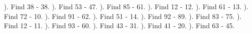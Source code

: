 \documentclass{article}%
\begin{document}
\newline%
). Find 38 {-} 38.%
\newline%
\newline%
). Find 53 {-} 47.%
\newline%
\newline%
). Find 85 {-} 61.%
\newline%
\newline%
). Find 12 {-} 12.%
\newline%
\newline%
). Find 61 {-} 13.%
\newline%
\newline%
). Find 72 {-} 10.%
\newline%
\newline%
). Find 91 {-} 62.%
\newline%
\newline%
). Find 51 {-} 14.%
\newline%
\newline%
). Find 92 {-} 89.%
\newline%
\newline%
). Find 83 {-} 75.%
\newline%
\newline%
). Find 12 {-} 11.%
\newline%
\newline%
). Find 93 {-} 60.%
\newline%
\newline%
). Find 43 {-} 31.%
\newline%
\newline%
). Find 41 {-} 20.%
\newline%
\newline%
). Find 63 {-} 45.%
\newline%
\newline%
\end{document}
